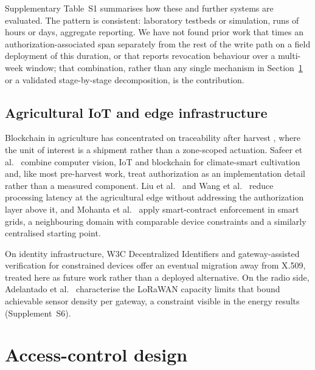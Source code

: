 \documentclass[a4paper,fleqn]{cas-dc}
\begin{document}
Supplementary Table~S1 summarises how these and further systems
\cite{zaidi2023fabrication,bandara2021modeling} are evaluated. The pattern
is consistent: laboratory testbeds or simulation, runs of hours or days,
aggregate reporting. We have not found prior work that times an
authorization-associated span separately from the rest of the write path on
a field deployment of this duration, or that reports revocation behaviour
over a multi-week window; that combination, rather than any single
mechanism in Section~\ref{sec:design} or a validated stage-by-stage
decomposition, is the contribution.

\subsection{Agricultural IoT and edge infrastructure}
\label{subsec:rw_agri}

Blockchain in agriculture has concentrated on traceability after harvest
\cite{tian2017traceability,lin2018blockchain,bandara2021modeling}, where the
unit of interest is a shipment rather than a zone-scoped actuation. Safeer et
al.\ \cite{safeer2025agrifarming} combine computer vision, IoT and blockchain
for climate-smart cultivation and, like most pre-harvest work, treat
authorization as an implementation detail rather than a measured component.
Liu et al.\ \cite{liu2019edge} and Wang et al.\ \cite{wang2021edge} reduce
processing latency at the agricultural edge without addressing the
authorization layer above it, and Mohanta et al.\ \cite{mohanta2025smartgrid}
apply smart-contract enforcement in smart grids, a neighbouring domain with
comparable device constraints and a similarly centralised starting point.

On identity infrastructure, W3C Decentralized Identifiers
\cite{w3c_did_core} and gateway-assisted verification for constrained devices
\cite{ferdous2019ssi,tara2023decentralized} offer an eventual migration away
from X.509, treated here as future work rather than a deployed alternative.
On the radio side, Adelantado et al.\ \cite{adelantado2017understanding}
characterise the LoRaWAN capacity limits that bound achievable sensor density
per gateway, a constraint visible in the energy results (Supplement~S6).

\section{Access-control design}
\label{sec:design}
\end{document}
